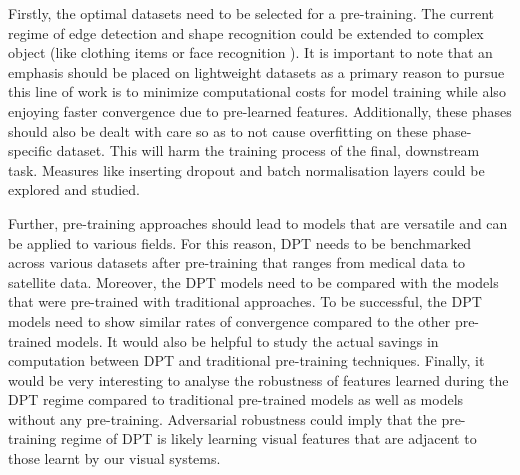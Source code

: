 Firstly, the optimal datasets need to be selected for a pre-training. The current regime of edge detection and shape recognition could be extended to complex object (like clothing items \cite{xiao2017fashion} or face recognition \cite{cao2018vggface2}). It is important to note that an emphasis should be placed on lightweight datasets as a primary reason to pursue this line of work is to minimize computational costs for model training while also enjoying faster convergence due to pre-learned features. Additionally, these phases should also be dealt with care so as to not cause overfitting on these phase-specific dataset. This will harm the training process of the final, downstream task. Measures like inserting dropout and batch normalisation layers could be explored and studied.

Further, pre-training approaches should lead to models that are versatile and can be applied to various fields. For this reason, DPT needs to be benchmarked across various datasets after pre-training that ranges from medical data to satellite data. Moreover, the DPT models need to be compared with the models that were pre-trained with traditional approaches. To be successful, the DPT models need to show similar rates of convergence compared to the other pre-trained models. It would also be helpful to study the actual savings in computation between DPT and traditional pre-training techniques. Finally, it would be very interesting to analyse the robustness of features learned during the DPT regime compared to traditional pre-trained models as well as models without any pre-training. Adversarial robustness could imply that the pre-training regime of DPT is likely learning visual features that are adjacent to those learnt by our visual systems.